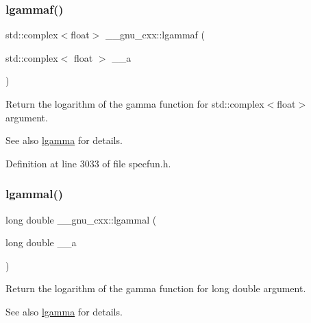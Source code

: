 \subsubsection{\texorpdfstring{lgammaf()}{lgammaf()}\hspace{0.1cm}{\footnotesize\ttfamily [2/2]}}
{\footnotesize\ttfamily std\+::complex$<$float$>$ \+\_\+\+\_\+gnu\+\_\+cxx\+::lgammaf (\begin{DoxyParamCaption}\item[{std\+::complex$<$ float $>$}]{\+\_\+\+\_\+a }\end{DoxyParamCaption})\hspace{0.3cm}{\ttfamily [inline]}}

Return the logarithm of the gamma function for {\ttfamily  std\+::complex$<$float$>$ } argument.

\begin{DoxySeeAlso}{See also}
\hyperlink{group__mathsf__gnu_ga40fa5127f7c419ed1d8f1c6a6f96ea9b}{lgamma} for details. 
\end{DoxySeeAlso}


Definition at line 3033 of file specfun.\+h.

\mbox{\label{group__mathsf__gnu_gabc66f234f4554cd5ff878792cc85bd37}} 
\subsubsection{\texorpdfstring{lgammal()}{lgammal()}\hspace{0.1cm}{\footnotesize\ttfamily [1/2]}}
{\footnotesize\ttfamily long double \+\_\+\+\_\+gnu\+\_\+cxx\+::lgammal (\begin{DoxyParamCaption}\item[{long double}]{\+\_\+\+\_\+a }\end{DoxyParamCaption})\hspace{0.3cm}{\ttfamily [inline]}}

Return the logarithm of the gamma function for {\ttfamily  long double } argument.

\begin{DoxySeeAlso}{See also}
\hyperlink{group__mathsf__gnu_ga40fa5127f7c419ed1d8f1c6a6f96ea9b}{lgamma} for details. 
\end{DoxySeeAlso}


